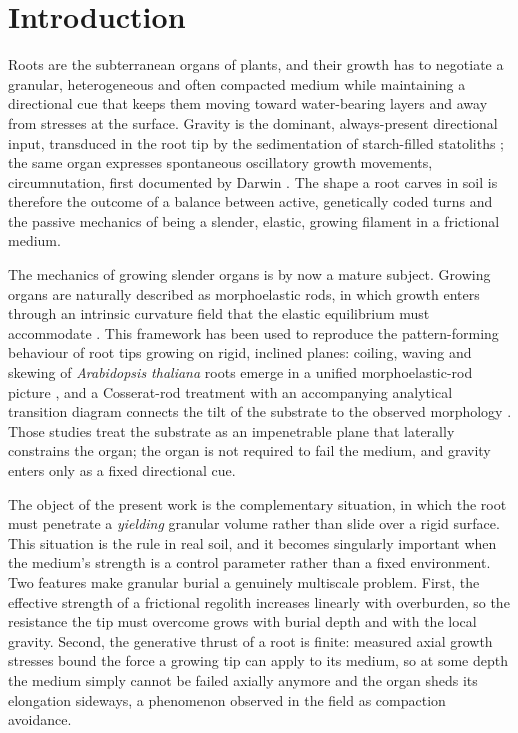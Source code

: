 \documentclass[preprint,12pt]{elsarticle}
\begin{document}
\section{Introduction}
\label{sec:intro}

Roots are the subterranean organs of plants, and their growth has to
negotiate a granular, heterogeneous and often compacted medium while
maintaining a directional cue that keeps them moving toward water-bearing
layers and away from stresses at the surface. Gravity is the dominant,
always-present directional input, transduced in the root tip by the
sedimentation of starch-filled statoliths \cite{morita2010}; the same organ
expresses spontaneous oscillatory growth movements, circumnutation, first
documented by Darwin \cite{darwin1880}. The shape a root carves in soil is
therefore the outcome of a balance between active, genetically coded turns
and the passive mechanics of being a slender, elastic, growing filament in a
frictional medium.

The mechanics of growing slender organs is by now a mature subject. Growing
organs are naturally described as morphoelastic rods, in which growth enters
through an intrinsic curvature field that the elastic equilibrium must
accommodate \cite{goriely2007,moulton2013,goriely2017}. This framework has
been used to reproduce the pattern-forming behaviour of root tips growing on
rigid, inclined planes: coiling, waving and skewing of \emph{Arabidopsis
thaliana} roots emerge in a unified morphoelastic-rod picture
\cite{sipos2022}, and a Cosserat-rod treatment with an accompanying analytical
transition diagram connects the tilt of the substrate to the observed
morphology \cite{porat2024}. Those studies treat the substrate as an
impenetrable plane that laterally constrains the organ; the organ is not
required to fail the medium, and gravity enters only as a fixed directional
cue.

The object of the present work is the complementary situation, in which the
root must penetrate a \emph{yielding} granular volume rather than slide over
a rigid surface. This situation is the rule in real soil, and it becomes
singularly important when the medium's strength is a control parameter rather
than a fixed environment. Two features make granular burial a genuinely
multiscale problem. First, the effective strength of a frictional regolith
increases linearly with overburden, so the resistance the tip must overcome
grows with burial depth and with the local gravity. Second, the generative
thrust of a root is finite: measured axial growth stresses bound the force a
growing tip can apply to its medium, so at some depth the medium simply
cannot be failed axially anymore and the organ sheds its elongation sideways,
a phenomenon observed in the field as compaction avoidance.
\end{document}

